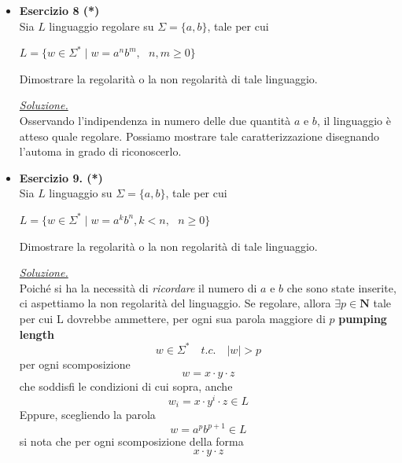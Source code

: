 \documentclass[a4paper,10pt]{article}
\begin{document}
{\normalsize
\begin{itemize}[label=, leftmargin=0pt]

    \item \textbf{Esercizio 8 (*)}\\ Sia $L$ linguaggio regolare su $\Sigma=\{a,b\}$, tale per cui 
    {\begin{center}
        $L = \{ w \in \Sigma^* \mid w = a^nb^m,\ \ \  n,m\geq0 \}$
    \end{center}} 
    Dimostrare la regolarità o la non regolarità di tale linguaggio.\\[0.1cm]

    \begin{osservazioni}
        \underline{\textit{Soluzione.}}\\
        Osservando l'indipendenza in numero delle due quantità $a$ e $b$, il linguaggio è atteso quale regolare. Possiamo mostrare tale caratterizzazione disegnando l'automa in grado di riconoscerlo.
            {
    \small
    \begin{center}
    \end{center}
    }
    \end{osservazioni}

    \item \textbf{Esercizio 9. (*)}\\ Sia $L$ linguaggio su $\Sigma=\{a,b\}$, tale per cui 
    {\begin{center}
        $L = \{ w \in \Sigma^* \mid w = a^kb^n, k<n, \ \ \ n\geq 0\}$
    \end{center}} 
    Dimostrare la regolarità o la non regolarità di tale linguaggio.\\[0.1cm]

    \begin{osservazioni}
        \underline{\textit{Soluzione.}}\\
        Poiché si ha la necessità di \textit{ricordare} il numero di $a$ e $b$ che sono state inserite, ci aspettiamo la non regolarità del linguaggio. Se regolare, allora $\exists p\in \mathbf{N}$ tale per cui L dovrebbe ammettere, per ogni sua parola maggiore di $p$ \textbf{pumping length}$$w\in \Sigma^* \quad t.c.\quad |w|>p$$ per ogni scomposizione $$w=x\cdot y \cdot z$$ che soddisfi le condizioni di cui sopra, anche $$w_i=x\cdot y^i \cdot z \in L$$
        Eppure, scegliendo la parola $$w=a^{p}b^{p+1}\in L$$si nota che per ogni scomposizione della forma $$x\cdot y \cdot z$$ 
    \end{osservazioni}


\end{itemize}}
\end{document}
